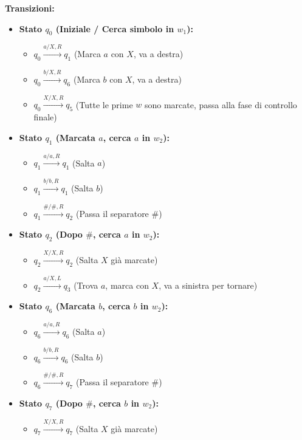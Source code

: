 \documentclass[a4paper]{article}
\theoremstyle{definition} %
\begin{document}
\noindent \textbf{Transizioni:}
\begin{itemize}
    \item \textbf{Stato $q_0$ (Iniziale / Cerca simbolo in $w_1$):}
        \begin{itemize}
            \item $q_0 \xrightarrow{a / X, R} q_1$ (Marca $a$ con $X$, va a destra)
            \item $q_0 \xrightarrow{b / X, R} q_6$ (Marca $b$ con $X$, va a destra)
            \item $q_0 \xrightarrow{X / X, R} q_5$ (Tutte le prime $w$ sono marcate, passa alla fase di controllo finale)
        \end{itemize}
    \item \textbf{Stato $q_1$ (Marcata $a$, cerca $a$ in $w_2$):}
        \begin{itemize}
            \item $q_1 \xrightarrow{a / a, R} q_1$ (Salta $a$)
            \item $q_1 \xrightarrow{b / b, R} q_1$ (Salta $b$)
            \item $q_1 \xrightarrow{\# / \#, R} q_2$ (Passa il separatore $\#$)
        \end{itemize}
    \item \textbf{Stato $q_2$ (Dopo $\#$, cerca $a$ in $w_2$):}
        \begin{itemize}
            \item $q_2 \xrightarrow{X / X, R} q_2$ (Salta $X$ già marcate)
            \item $q_2 \xrightarrow{a / X, L} q_3$ (Trova $a$, marca con $X$, va a sinistra per tornare)
        \end{itemize}
    \item \textbf{Stato $q_6$ (Marcata $b$, cerca $b$ in $w_2$):}
        \begin{itemize}
            \item $q_6 \xrightarrow{a / a, R} q_6$ (Salta $a$)
            \item $q_6 \xrightarrow{b / b, R} q_6$ (Salta $b$)
            \item $q_6 \xrightarrow{\# / \#, R} q_7$ (Passa il separatore $\#$)
        \end{itemize}
    \item \textbf{Stato $q_7$ (Dopo $\#$, cerca $b$ in $w_2$):}
        \begin{itemize}
            \item $q_7 \xrightarrow{X / X, R} q_7$ (Salta $X$ già marcate)

\end{itemize}
\end{itemize}
\end{document}

